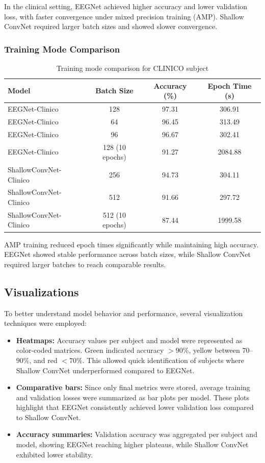 \documentclass[12pt,a4paper]{article}
\begin{document}
In the clinical setting, EEGNet achieved higher accuracy and lower validation loss, with faster convergence under mixed precision training (AMP). Shallow ConvNet required larger batch sizes and showed slower convergence.

\subsubsection{Training Mode Comparison}

\begin{table}[H]
\centering
\caption{Training mode comparison for CLINICO subject}
\label{tab:training_modes}
\begin{tabular}{@{}lccc@{}}
\toprule
\textbf{Model} & \textbf{Batch Size} & \textbf{Accuracy (\%)} & \textbf{Epoch Time (s)} \\ \midrule
EEGNet-Clinico & 128 & 97.31 & 306.91 \\
EEGNet-Clinico & 64 & 96.45 & 313.49 \\
EEGNet-Clinico & 96 & 96.67 & 302.41 \\
EEGNet-Clinico & 128 (10 epochs) & 91.27 & 2084.88 \\
ShallowConvNet-Clinico & 256 & 94.73 & 304.11 \\
ShallowConvNet-Clinico & 512 & 91.66 & 297.72 \\
ShallowConvNet-Clinico & 512 (10 epochs) & 87.44 & 1999.58 \\ \bottomrule
\end{tabular}
\end{table}

AMP training reduced epoch times significantly while maintaining high accuracy. EEGNet showed stable performance across batch sizes, while Shallow ConvNet required larger batches to reach comparable results.


\subsection{Visualizations}

To better understand model behavior and performance, several visualization techniques were employed:

\begin{itemize}
    \item \textbf{Heatmaps:} Accuracy values per subject and model were represented as color-coded matrices. Green indicated accuracy $>90\%$, yellow between $70$--$90\%$, and red $<70\%$. This allowed quick identification of subjects where Shallow ConvNet underperformed compared to EEGNet.
    \item \textbf{Comparative bars:} Since only final metrics were stored, average training and validation losses were summarized as bar plots per model. These plots highlight that EEGNet consistently achieved lower validation loss compared to Shallow ConvNet.
    \item \textbf{Accuracy summaries:} Validation accuracy was aggregated per subject and model, showing EEGNet reaching higher plateaus, while Shallow ConvNet exhibited lower stability.
\end{itemize}
\end{document}
